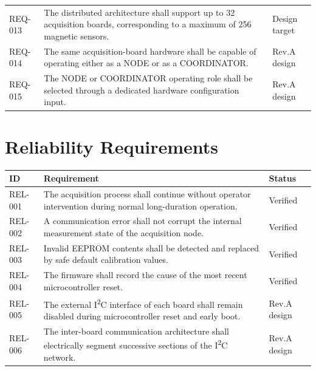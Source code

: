 \begin{longtable}{p{18mm}p{106mm}p{23mm}}
	REQ-013 &
	The distributed architecture shall support up to 32 acquisition boards, corresponding to a maximum of 256 magnetic sensors. &
	Design target \\
	
	REQ-014 &
	The same acquisition-board hardware shall be capable of operating either as a NODE or as a COORDINATOR. &
	Rev.A design \\
	
	REQ-015 &
	The NODE or COORDINATOR operating role shall be selected through a dedicated hardware configuration input. &
	Rev.A design \\
	
	\bottomrule
\end{longtable}

\section{Reliability Requirements}

\begin{longtable}{p{18mm}p{106mm}p{23mm}}
	\toprule
	ID & Requirement & Status \\
	\midrule
	
	REL-001 &
	The acquisition process shall continue without operator intervention during normal long-duration operation. &
	Verified \\
	
	REL-002 &
	A communication error shall not corrupt the internal measurement state of the acquisition node. &
	Verified \\
	
	REL-003 &
	Invalid EEPROM contents shall be detected and replaced by safe default calibration values. &
	Verified \\
	
	REL-004 &
	The firmware shall record the cause of the most recent microcontroller reset. &
	Verified \\
	
	REL-005 &
	The external I\textsuperscript{2}C interface of each board shall remain disabled during microcontroller reset and early boot. &
	Rev.A design \\
	
	REL-006 &
	The inter-board communication architecture shall electrically segment successive sections of the I\textsuperscript{2}C network. &
	Rev.A design \\
	
	\bottomrule
\end{longtable}

